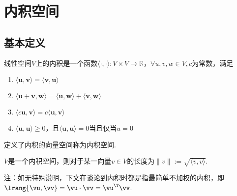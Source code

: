 
\section{内积空间}
\subsection{基本定义}
\begin{definition}[内积空间]
线性空间$V$上的内积是一个函数$\langle\cdot,\cdot\rangle:V\times V\to\mathbb{R}$，$\forall u,v,w\in V,c$为常数，满足
\begin{enumerate}
	\itemsep -3pt
	\item $\langle \mathbf{u},\mathbf{v} \rangle=\langle \mathbf{v},\mathbf{u} \rangle$
	\item $\langle \mathbf{u}+\mathbf{v},\mathbf{w} \rangle=\langle \mathbf{u},\mathbf{w} \rangle+\langle \mathbf{v},\mathbf{w} \rangle$
	\item $\langle c\mathbf{u},\mathbf{v} \rangle=c\langle \mathbf{u},\mathbf{v} \rangle$
	\item $\langle \mathbf{u},\mathbf{u} \rangle\geq 0$，且$\langle \mathbf{u},\mathbf{u} \rangle=0$当且仅当$u=0$
\end{enumerate}
定义了内积的向量空间称为内积空间.
\end{definition}
\begin{definition}[长度/模/范数]
$V$是一个内积空间，则对于某一向量$v\in V$的长度为$\|v\|:=\sqrt{\langle v,v\rangle}$.
\end{definition}
注：如无特殊说明，下文在谈论到内积时都是指最简单不加权的内积，即$\lrang{\vu,\vv}=\vu\cdot\vv=\vu^\T \vv$.

